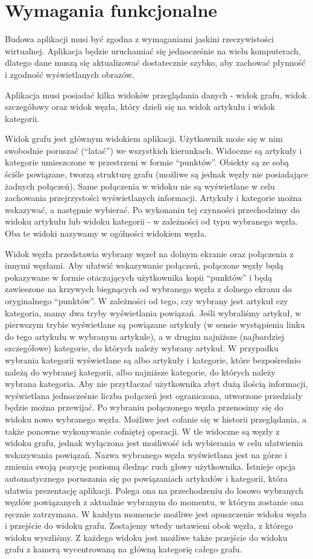 \section{Wymagania funkcjonalne}
Budowa aplikacji musi być zgodna z wymaganiami jaskini rzeczywistości wirtualnej. Aplikacja będzie uruchamiać się jednocześnie na wielu komputerach, dlatego dane muszą się aktualizować dostatecznie szybko, aby zachować płynność i zgodność wyświetlanych obrazów.

Aplikacja musi posiadać kilka widoków przeglądania danych - widok grafu, widok szczegółowy oraz widok węzła, który dzieli się na widok artykułu i widok kategorii.

Widok grafu jest głównym widokiem aplikacji. Użytkownik może się w nim swobodnie poruszać (``latać'') we wszystkich kierunkach. Widoczne są artykuły i kategorie umieszczone w przestrzeni w formie ``punktów''. Obiekty są ze sobą ściśle powiązane, tworzą strukturę grafu (możliwe są jednak węzły nie posiadające żadnych połączeń). Same połączenia w widoku nie są wyświetlane w celu zachowania przejrzystości wyświetlanych informacji. Artykuły i kategorie można wskazywać, a następnie wybierać. Po wykonaniu tej czynności przechodzimy do widoku artykułu lub widoku kategorii - w zależności od typu wybranego węzła. Oba te widoki nazywamy w ogólności widokiem węzła.

Widok węzła przedstawia wybrany węzeł na dolnym ekranie oraz połączenia z innymi węzłami. Aby ułatwić wskazywanie połączeń, połączone węzły będą pokazywane w formie otaczających użytkownika kopii ``punktów'' i będą zawieszone na krzywych biegnących od wybranego węzła z dolnego ekranu do oryginalnego ``punktów''. W zależności od tego, czy wybrany jest artykuł czy kategoria, mamy dwa tryby wyświetlania powiązań. Jeśli wybraliśmy artykuł, w pierwszym trybie wyświetlane są powiązane artykuły (w sensie wystąpienia linku do tego artykułu w wybranym artykule), a w drugim najniższe (najbardziej szczegółowe)  kategorie, do których należy wybrany artykuł. W przypadku wybrania kategorii wyświetlane są albo artykuły i kategorie, które bezpośrednio należą do wybranej kategorii, albo najniższe kategorie, do których należy wybrana kategoria. Aby nie przytłaczać użytkownika zbyt dużą ilością informacji, wyświetlana jednocześnie liczba połączeń jest ograniczona, utworzone przedziały będzie można przewijać. Po wybraniu połączonego węzła przenosimy się do widoku nowo wybranego węzła. Możliwe jest cofanie się w historii przeglądania, a także ponowne wykonywanie cofniętej operacji. W tle widoczne są węzły z widoku grafu, jednak wyłączona jest możliwość ich wybierania w celu ułatwienia wskazywania powiązań. Nazwa wybranego węzła wyświetlana jest na górze i zmienia swoją pozycję poziomą śledząc ruch głowy użytkownika. Istnieje opcja automatycznego poruszania się po powiązaniach artykułów i kategorii, która ułatwia prezentację aplikacji. Polega ona na przechodzeniu do losowo wybranych węzłów powiązanych z aktualnie wybranym do momentu, w którym zostanie ona ręcznie zatrzymana. W każdym momencie możliwe jest opuszczenie widoku węzła i przejście do widoku grafu. Zostajemy wtedy ustawieni obok węzła, z którego widoku wyszliśmy. Z każdego widoku jest możliwe także przejście do widoku grafu z kamerą wycentrowaną na główną kategorię całego grafu.

